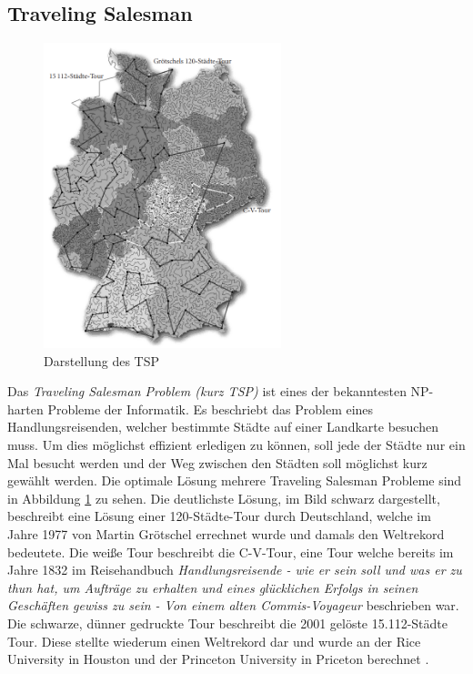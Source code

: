 \documentclass[12pt, a4paper]{article}
\begin{document}
\subsection{Traveling Salesman \label{kap:TSP}}
\begin{figure}
	\includegraphics[width=6.9cm]{Groetschel.PNG}
	\caption[Darstellung des TSP\newline \cite{Groetschel.2005} ]{Darstellung des TSP}
    \label{img:TSP}
\end{figure}
Das \textit{Traveling Salesman Problem (kurz TSP)} ist eines der bekanntesten NP-harten Probleme der Informatik. Es beschriebt das Problem eines Handlungsreisenden, welcher bestimmte Städte auf einer Landkarte besuchen muss. Um dies möglichst effizient erledigen zu können, soll jede der Städte nur ein Mal besucht werden und der Weg zwischen den Städten soll möglichst kurz gewählt werden. Die optimale Lösung mehrere Traveling Salesman Probleme sind in Abbildung \ref{img:TSP} zu sehen. Die deutlichste Lösung, im Bild schwarz dargestellt, beschreibt eine Lösung einer 120-Städte-Tour durch Deutschland, welche im Jahre 1977 von Martin Grötschel errechnet wurde und damals den Weltrekord bedeutete. Die weiße Tour beschreibt die C-V-Tour, eine Tour welche bereits im Jahre 1832 im Reisehandbuch \textit{Handlungsreisende - wie er sein soll und was er zu thun hat, um Aufträge zu erhalten und eines glücklichen Erfolgs in seinen Geschäften gewiss zu sein - Von einem alten Commis-Voyageur} beschrieben war. Die schwarze, dünner gedruckte Tour beschreibt die 2001 gelöste 15.112-Städte Tour. Diese stellte wiederum einen Weltrekord dar und wurde an der Rice University in Houston und der Princeton University in Priceton berechnet \cite[vgl. Seite 111-112]{Groetschel.2005}.
\end{document}
